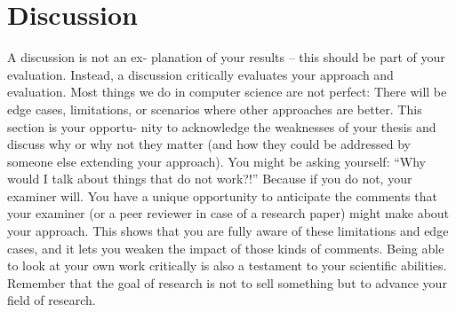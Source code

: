 \chapter{Discussion}\label{sec:discussion}
A discussion is not an ex- planation of your results – this should be part of your evaluation. Instead, a discussion critically evaluates your approach and evaluation. Most things we do in computer science are not perfect: There will be edge cases, limitations, or scenarios where other approaches are better. This section is your opportu- nity to acknowledge the weaknesses of your thesis and discuss why or why not they matter (and how they could be addressed by someone else extending your approach).
You might be asking yourself: “Why would I talk about things that do not work?!” Because if you do not, your examiner will. You have a unique opportunity to anticipate the comments that your examiner (or a peer reviewer in case of a research paper) might make about your approach. This shows that you are fully aware of these limitations and edge cases, and it lets you weaken the impact of those kinds of comments. Being able to look at your own work critically is also a testament to your scientific abilities. Remember that the goal of research is not to sell something but to advance your field of research.
